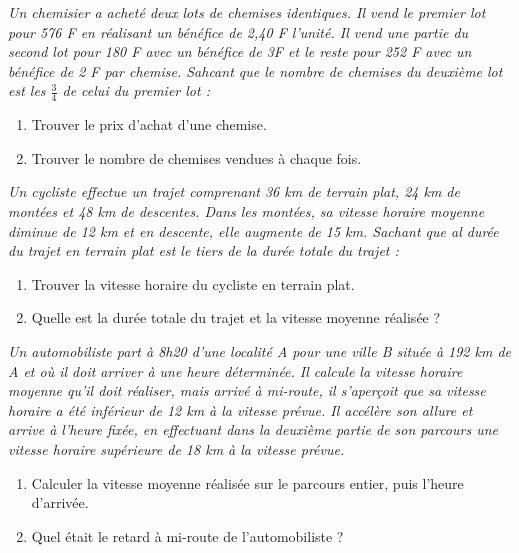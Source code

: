 \begin{itemize}
\it Un chemisier a acheté deux lots de chemises identiques. Il vend le premier lot pour 576 F en réalisant un bénéfice de 2,40 F l'unité. Il vend une partie du second lot pour 180 F avec un bénéfice de 3F et le reste pour 252 F avec un bénéfice de 2 F par chemise. Sahcant que le nombre de chemises du deuxième lot est les $\frac34$ de celui du premier lot : \begin{enumerate}
\item Trouver le prix d'achat d'une chemise.
\item Trouver le nombre de chemises vendues à chaque fois.
\end{enumerate}
\it Un cycliste effectue un trajet comprenant 36 km de terrain plat, 24 km de montées et 48 km de descentes. Dans les montées, sa vitesse horaire moyenne diminue de 12 km et en descente, elle augmente de 15 km. Sachant que al durée du trajet en terrain plat est le tiers de la durée totale du trajet : \begin{enumerate}
\item Trouver la vitesse horaire du cycliste en terrain plat.
\item Quelle est la durée totale du trajet et la vitesse moyenne réalisée ?
\end{enumerate}
\it Un automobiliste part à 8h20 d'une localité A pour une ville B située à 192 km de A et où il doit arriver à une heure déterminée. Il calcule la vitesse horaire moyenne qu'il doit réaliser, mais arrivé à mi-route, il s'aperçoit que sa vitesse horaire a été inférieur de 12 km à la vitesse prévue. Il accélère son allure et arrive à l'heure fixée, en effectuant dans la deuxième partie de son parcours une vitesse horaire supérieure de 18 km à la vitesse prévue. \begin{enumerate}
\item Calculer la vitesse moyenne réalisée sur le parcours entier, puis l'heure d'arrivée. 
\item Quel était le retard à mi-route de l'automobiliste ?
\end{enumerate}
\end{itemize}